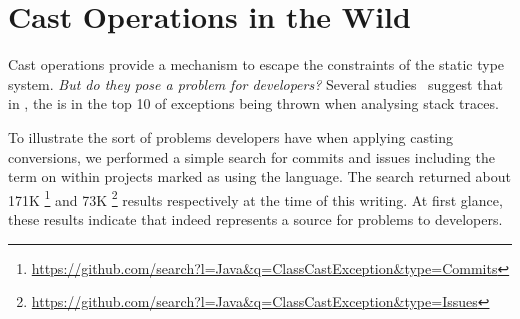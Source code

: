 
\chapter{Cast Operations in the Wild}
\label{cha:casts}

Cast operations provide a mechanism to escape the constraints of the static type system.
\emph{But do they pose a problem for developers?}
Several studies~\citep{kechagiaUndocumentedUncheckedExceptions2014,coelhoUnveilingExceptionHandling2015,zhitnitskyTop10Exception2016}
suggest that in \java{}, the  is in the top 10 of exceptions being thrown when analysing stack traces.

To illustrate the sort of problems developers have when applying casting conversions, we performed a simple search for commits and issues including the term  on \github{} within projects marked as using the \java{} language.
The search returned about 171K%
\footnote{\url{https://github.com/search?l=Java&q=ClassCastException&type=Commits}}
and 73K%
\footnote{\url{https://github.com/search?l=Java&q=ClassCastException&type=Issues}}
results respectively at the time of this writing.
At first glance, these results indicate that indeed  represents a source for problems to developers.







